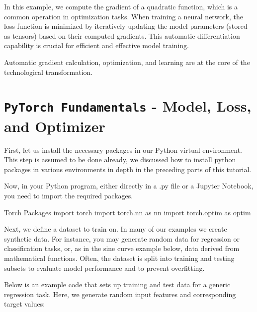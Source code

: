 In this example, we compute the gradient of a quadratic function, which is a common operation in optimization tasks. When training a neural network, the loss function is minimized by iteratively updating the model parameters (stored as tensors) based on their computed gradients. This automatic differentiation capability is crucial for efficient and effective model training.

\begin{recommendationbox}
Automatic gradient calculation, optimization, and learning are at the core of the technological transformation.
\end{recommendationbox}

%
\section{\texttt{PyTorch Fundamentals} - Model, Loss, and Optimizer}

First, let us install the necessary packages in our Python virtual environment. This step is assumed to be done already, we discussed how to install python packages in various environments in depth in the preceding parts of this tutorial. 

Now, in your Python program, either directly in a .py file or a Jupyter Notebook, you need to import the required packages.

\begin{codeonly}{Torch Packages}
import torch
import torch.nn as nn
import torch.optim as optim
\end{codeonly}


Next, we define a dataset to train on. In many of our examples we create synthetic data. For instance, you may generate random data for regression or classification tasks, or, as in the sine curve example below, data derived from mathematical functions. Often, the dataset is split into training and testing subsets to evaluate model performance and to prevent overfitting.

Below is an example code that sets up training and test data for a generic regression task. Here, we generate random input features and corresponding target values:

